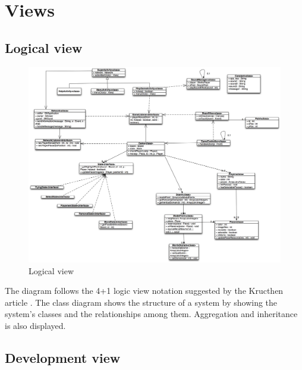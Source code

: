 \pagebreak

\section{Views}
\subsection{Logical view}

\begin{figure}[H]
\begin{center}
\includegraphics[width=1.2\textwidth]{./Images/LogicalView_final.png}
\end{center}
\caption{Logical view}
\end{figure}

The diagram follows the 4+1 logic view notation suggested by the Kructhen article \cite{krutchen}. The class diagram shows the structure of a system by showing the system's classes  and the relationships among them. Aggregation and inheritance is also displayed.

\subsection{Development view}

